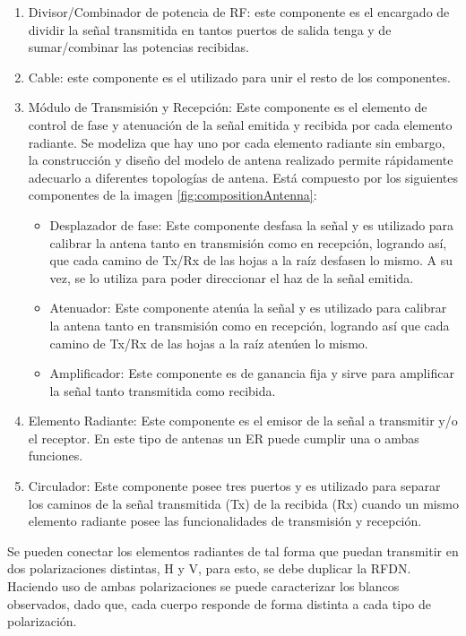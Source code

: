 \begin{enumerate}
	\item Divisor/Combinador de potencia de RF: este componente es el encargado de dividir la señal transmitida en tantos puertos 
		de salida tenga y de sumar/combinar las potencias recibidas.
	\item Cable: este componente es el utilizado para unir el resto de los componentes.
	\item Módulo de Transmisión y Recepción: Este componente es el elemento de control de fase y atenuación de la señal emitida y
		recibida por cada elemento radiante. Se modeliza que hay uno por cada elemento radiante sin embargo, la construcción y 
		diseño del modelo de antena realizado permite rápidamente adecuarlo a diferentes topologías de antena. Está compuesto por 
		los siguientes componentes de la imagen \ref{fig:compositionAntenna}:
		\begin{itemize}
			\item Desplazador de fase: Este componente desfasa la señal y es utilizado para calibrar la antena tanto en transmisión como
				en recepción, logrando así, que cada camino de Tx/Rx de las hojas a la raíz desfasen lo mismo. A su vez, se lo utiliza 
				para poder direccionar el haz de la señal emitida.
			\item Atenuador: Este componente atenúa la señal y es utilizado para calibrar la antena tanto en transmisión como en 
				recepción, logrando así que cada camino de Tx/Rx de las hojas a la raíz atenúen lo mismo. 
			\item Amplificador: Este componente es de ganancia fija y sirve para amplificar la señal tanto transmitida como recibida. 
		\end{itemize}
	\item Elemento Radiante: Este componente es el emisor de la señal a transmitir y/o el receptor. En este tipo de antenas un
		ER puede cumplir una o ambas funciones.
	\item Circulador: Este componente posee tres puertos y es utilizado para separar los caminos de la señal transmitida (Tx) de 
		la recibida (Rx) cuando un mismo elemento radiante posee las funcionalidades de transmisión y recepción. 
\end{enumerate}

Se pueden conectar los elementos radiantes de tal forma que puedan transmitir en dos polarizaciones distintas, H y V, para esto,
se debe duplicar la RFDN. Haciendo uso de ambas polarizaciones se puede caracterizar los blancos observados, dado que, cada
cuerpo responde de forma distinta a cada tipo de polarización.

